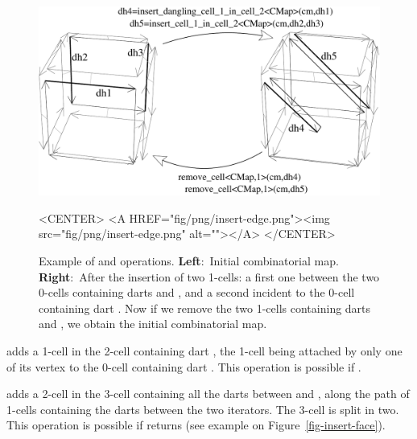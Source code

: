 \begin{figure}[htb]
  \begin{ccTexOnly}
    \begin{center}
      \includegraphics[width=.72\textwidth]{Combinatorial_map/fig/pdf/insert-edge}
    \end{center}
  \end{ccTexOnly}
  \begin{ccHtmlOnly}
    <CENTER> <A HREF="fig/png/insert-edge.png"><img
    src="fig/png/insert-edge.png" alt=""></A> </CENTER>
  \end{ccHtmlOnly}
  \caption{Example of  and
     operations. \textbf{Left}:~Initial
    combinatorial map.  \textbf{Right}:~After the insertion of two
    1-cells: a first one between the two 0-cells containing darts
     and , and a second incident to the 0-cell
    containing dart . Now if we remove the two
    1-cells containing darts  and , we obtain the
    initial combinatorial map.}
  \label{fig-insert-edge}
\end{figure}


 adds a 1-cell in
the 2-cell containing dart , the 1-cell being attached by only
one of its vertex to the 0-cell containing dart .
This operation is possible if \myin{}.

 adds a
2-cell in the 3-cell containing all the darts between
 and , along the path of 1-cells
containing the darts between the two iterators. The 3-cell is
split in two. This operation is possible if
 returns
 (see example on Figure~\ref{fig-insert-face}).


